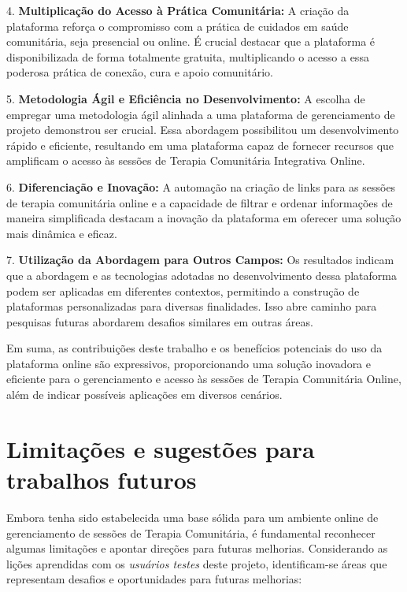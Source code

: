     4. \textbf{Multiplicação do Acesso à Prática Comunitária:}
       A criação da plataforma reforça o compromisso com a prática de cuidados em saúde comunitária, seja presencial ou online. É crucial destacar que a plataforma é disponibilizada de forma totalmente gratuita, multiplicando o acesso a essa poderosa prática de conexão, cura e apoio comunitário.
    
    5. \textbf{Metodologia Ágil e Eficiência no Desenvolvimento:}
       A escolha de empregar uma metodologia ágil alinhada a uma plataforma de gerenciamento de projeto demonstrou ser crucial. Essa abordagem possibilitou um desenvolvimento rápido e eficiente, resultando em uma plataforma capaz de fornecer recursos que amplificam o acesso às sessões de Terapia Comunitária Integrativa Online.
    
    6. \textbf{Diferenciação e Inovação:}
       A automação na criação de links para as sessões de terapia comunitária online e a capacidade de filtrar e ordenar informações de maneira simplificada destacam a inovação da plataforma em oferecer uma solução mais dinâmica e eficaz.
    
    7. \textbf{Utilização da Abordagem para Outros Campos:}
       Os resultados indicam que a abordagem e as tecnologias adotadas no desenvolvimento dessa plataforma podem ser aplicadas em diferentes contextos, permitindo a construção de plataformas personalizadas para diversas finalidades. Isso abre caminho para pesquisas futuras abordarem desafios similares em outras áreas.
    
    Em suma, as contribuições deste trabalho e os benefícios potenciais do uso da plataforma online são expressivos, proporcionando uma solução inovadora e eficiente para o gerenciamento e acesso às sessões de Terapia Comunitária Online, além de indicar possíveis aplicações em diversos cenários.

\section{Limitações e sugestões para trabalhos futuros}
    Embora tenha sido estabelecida uma base sólida para um ambiente online de gerenciamento de sessões de Terapia Comunitária, é fundamental reconhecer algumas limitações e apontar direções para futuras melhorias. Considerando as lições aprendidas com os \textit{usuários testes} deste projeto, identificam-se áreas que representam desafios e oportunidades para futuras melhorias:

